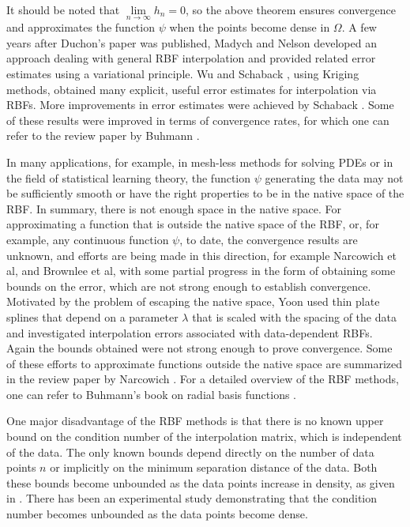 \documentclass[multixcb]{amstext-l}
\theoremstyle{plain}
\theoremstyle{definition}
\theoremstyle{definition}
\theoremstyle{remark}
\numberwithin{equation}{chapter}
\begin{document}
It should be noted that $\lim\limits_{n\to\infty}h_n = 0$, so the above theorem ensures convergence and approximates the function $\psi$ when the points become dense in $\Omega$.
A few years after Duchon's paper was published, Madych and Nelson \cite{madych1990multivariate} developed an approach dealing with general RBF interpolation and provided related error estimates using a variational principle. Wu and Schaback \cite{wu1993local}, using Kriging methods, obtained many explicit, useful error estimates for interpolation via RBFs. More improvements in error estimates were achieved by Schaback \cite{schaback1999improved}. Some of these results were improved in terms of convergence rates, for which one can refer to the review paper by Buhmann \cite{buhmann_2000}.

In many applications, for example, in mesh-less methods for solving PDEs or in the field of statistical learning theory, the function $\psi$ generating the data may not be sufficiently smooth or have the right properties to be in the native space of the RBF. In summary, there is not enough space in the native space. For approximating a function that is outside the native space of the RBF, or, for example, any continuous function $\psi$, to date, the convergence results are unknown, and efforts are being made in this direction, for example   Narcowich et al, \cite{narcowich2004scattered, narcowich2005sobolev} and Brownlee et al, \cite{brownlee2004approximation} with some partial progress in the form of obtaining some bounds on the error, which are not strong enough to establish convergence. Motivated by the problem of escaping the native space, Yoon \cite{yoon2001spectral} used thin plate splines that depend on a parameter $\lambda$ that is scaled with the spacing of the data and investigated interpolation errors associated with data-dependent RBFs. Again the bounds obtained were not strong enough to prove convergence. Some of these efforts to approximate functions outside the native space are summarized in the review paper by Narcowich \cite{narcowich2005recent}. For a detailed overview of the RBF methods, one can refer to Buhmann's book on radial basis functions \cite{buhmann_2003}. 

One major disadvantage of the RBF methods is that there is no known upper bound on the condition number of the interpolation matrix, which is independent of the data. The only known bounds depend directly on the number of data points $n$ or implicitly on the minimum separation distance of the data. Both these bounds become unbounded as the data points increase in density, as given in \cite{narcowich1991norms}. There has been an experimental study \cite{boyd2011numerical} demonstrating that the condition number becomes unbounded as the data points become dense.
\end{document}
